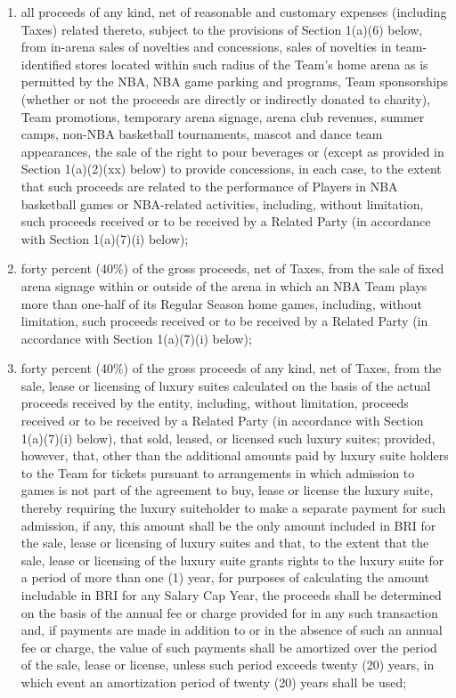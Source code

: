 \documentclass[
]{book}
\begin{document}
\begin{enumerate}
\begin{enumerate}
\begin{enumerate}
    \item
      all proceeds of any kind, net of reasonable and customary expenses (including Taxes) related thereto, subject to the provisions of Section 1(a)(6) below, from in-arena sales of novelties and concessions, sales of novelties in team-identified stores located within such radius of the Team's home arena as is permitted by the NBA, NBA game parking and programs, Team sponsorships (whether or not the proceeds are directly or indirectly donated to charity), Team promotions, temporary arena signage, arena club revenues, summer camps, non-NBA basketball tournaments, mascot and dance team appearances, the sale of the right to pour beverages or (except as provided in Section 1(a)(2)(xx) below) to provide concessions, in each case, to the extent that such proceeds are related to the performance of Players in NBA basketball games or NBA-related activities, including, without limitation, such proceeds received or to be received by a Related Party (in accordance with Section 1(a)(7)(i) below);
    \item
      forty percent (40\%) of the gross proceeds, net of Taxes, from the sale of fixed arena signage within or outside of the arena in which an NBA Team plays more than one-half of its Regular Season home games, including, without limitation, such proceeds received or to be received by a Related Party (in accordance with Section 1(a)(7)(i) below);
    \item
      forty percent (40\%) of the gross proceeds of any kind, net of Taxes, from the sale, lease or licensing of luxury suites calculated on the basis of the actual proceeds received by the entity, including, without limitation, proceeds received or to be received by a Related Party (in accordance with Section 1(a)(7)(i) below), that sold, leased, or licensed such luxury suites; provided, however, that, other than the additional amounts paid by luxury suite holders to the Team for tickets pursuant to arrangements in which admission to games is not part of the agreement to buy, lease or license the luxury suite, thereby requiring the luxury suiteholder to make a separate payment for such admission, if any, this amount shall be the only amount included in BRI for the sale, lease or licensing of luxury suites and that, to the extent that the sale, lease or licensing of the luxury suite grants rights to the luxury suite for a period of more than one (1) year, for purposes of calculating the amount includable in BRI for any Salary Cap Year, the proceeds shall be determined on the basis of the annual fee or charge provided for in any such transaction and, if payments are made in addition to or in the absence of such an annual fee or charge, the value of such payments shall be amortized over the period of the sale, lease or license, unless such period exceeds twenty (20) years, in which event an amortization period of twenty (20) years shall be used;

\end{enumerate}
\end{enumerate}
\end{enumerate}
\end{document}
